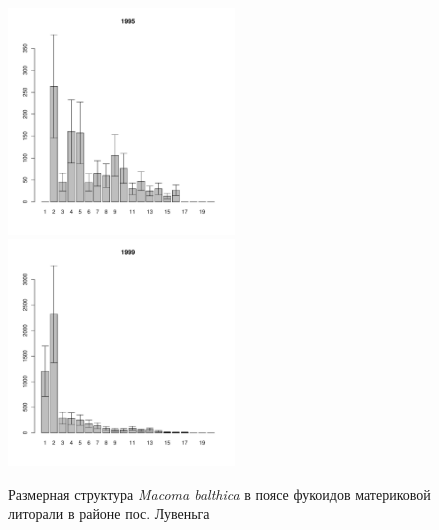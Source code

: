 \documentclass[12pt, a4paper]{article}
\begin{document}
\begin{figure}[h]
\begin{multicols}{3}
\hfill
\includegraphics[width=60mm]{../White_Sea/Luvenga_II_razrez/fucus_zone_1995_.pdf}
\hfill
\includegraphics[width=60mm]{../White_Sea/Luvenga_II_razrez/fucus_zone_1999_.pdf}

\end{multicols}


\caption{Размерная структура {\it Macoma balthica} в поясе фукоидов материковой литорали в районе пос. Лувеньга}
\label{ris:size_str_2razrez_fucus}
\end{figure}
\end{document}

